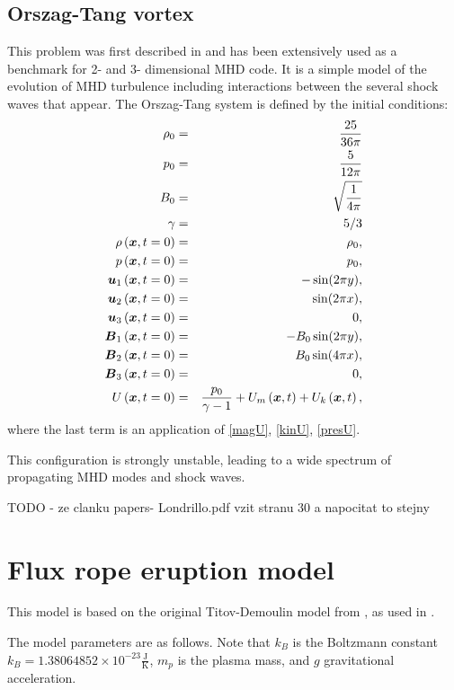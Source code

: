 \subsection{Orszag-Tang vortex}
This problem was first described in \cite{vortex} and has been extensively used as a benchmark for 2- and 3- dimensional MHD code. It is a simple model of the evolution of MHD turbulence including interactions between the several shock waves that appear. The Orszag-Tang system is defined by the initial conditions:
\begin{eqnarray}
\rho_0 & = & \frac{25}{36 \pi}\\ \nonumber
p_0 & = & \frac{5}{12 \pi}\\  \nonumber
B_0 & = & \sqrt{\frac{1}{4 \pi}}\\ \nonumber
\gamma & = & 5 / 3\\ \nonumber
\rho\left(\mbox{\boldmath $x$}, t = 0\right) & = & \rho_0,\\ \nonumber
p\left(\mbox{\boldmath $x$}, t = 0\right) & = & p_0,\\ \nonumber
\mbox{\boldmath $u$}_1\left(\mbox{\boldmath $x$}, t = 0\right) & = & -\sin(2 \pi y),\\ \nonumber
\mbox{\boldmath $u$}_2\left(\mbox{\boldmath $x$}, t = 0\right) & = & \sin(2 \pi x),\\ \nonumber
\mbox{\boldmath $u$}_3\left(\mbox{\boldmath $x$}, t = 0\right) & = & 0,\\ \nonumber
\mbox{\boldmath $B$}_1\left(\mbox{\boldmath $x$}, t = 0\right) & = & -B_0 \sin(2 \pi y),\\ \nonumber
\mbox{\boldmath $B$}_2\left(\mbox{\boldmath $x$}, t = 0\right) & = & B_0 \sin(4 \pi x),\\ \nonumber
\mbox{\boldmath $B$}_3\left(\mbox{\boldmath $x$}, t = 0\right) & = & 0,\\ \nonumber
U\left(\mbox{\boldmath $x$}, t = 0\right) & = & \frac{p_0}{\gamma - 1} + U_m\left(\mbox{\boldmath $x$}, t\right) + U_k\left(\mbox{\boldmath $x$}, t\right),
\end{eqnarray}
where the last term is an application of \ref{magU}, \ref{kinU}, \ref{presU}.

This configuration is strongly unstable, leading to a wide spectrum of propagating MHD modes and shock waves.

TODO - ze clanku papers- Londrillo.pdf vzit stranu 30 a napocitat to stejny

\section{Flux rope eruption model}
This model is based on the original Titov-Demoulin model from \cite{td}, as used in \cite{miraClanek}.

The model parameters are as follows. Note that $k_B$ is the Boltzmann constant $k_B = 1.38064852 \times 10^{-23} \frac{\mathrm{J}}{\mathrm{K}}$, $m_p$ is the plasma mass, and $g$ gravitational acceleration.

